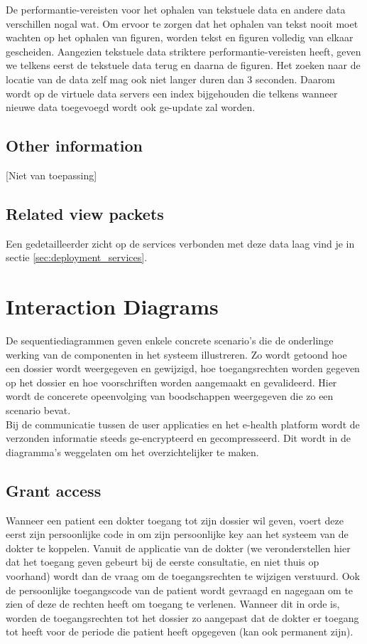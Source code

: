 \documentclass[a4paper,10pt]{article}
\begin{document}
De performantie-vereisten voor het ophalen van tekstuele data en andere data verschillen nogal wat. Om ervoor te zorgen dat het ophalen van tekst nooit moet wachten op het ophalen van figuren, worden tekst en figuren volledig van elkaar gescheiden. Aangezien tekstuele data striktere performantie-vereisten heeft, geven we telkens eerst de tekstuele data terug en daarna de figuren. Het zoeken naar de locatie van de data zelf mag ook niet langer duren dan 3 seconden. Daarom wordt op de virtuele data servers een index bijgehouden die telkens wanneer nieuwe data toegevoegd wordt ook ge-update zal worden.

\subsection{Other information}
[Niet van toepassing]

\subsection{Related view packets}
Een gedetailleerder zicht op de services verbonden met deze data laag vind je in sectie \ref{sec:deployment_services}.

\clearpage
\section{Interaction Diagrams}
\label{interaction:main}
De sequentiediagrammen geven enkele concrete scenario's die de onderlinge werking van de componenten in het systeem illustreren. Zo wordt getoond hoe een dossier wordt weergegeven en gewijzigd, hoe toegangsrechten worden gegeven op het dossier en hoe voorschriften worden aangemaakt en gevalideerd. Hier wordt de concerete opeenvolging van boodschappen weergegeven die zo een scenario bevat.\\

Bij de communicatie tussen de user applicaties en het e-health platform wordt de verzonden informatie steeds ge-encrypteerd en gecompresseerd. Dit wordt in de diagramma's weggelaten om het overzichtelijker te maken. 


\subsection{Grant access}
\label{interaction:grantAccess}
Wanneer een patient een dokter toegang tot zijn dossier wil geven, voert deze eerst zijn persoonlijke code in om zijn persoonlijke key aan het systeem van de dokter te koppelen. Vanuit de applicatie van de dokter (we veronderstellen hier dat het toegang geven gebeurt bij de eerste consultatie, en niet thuis op voorhand) wordt dan de vraag om de toegangsrechten te wijzigen verstuurd. Ook de persoonlijke toegangscode van de patient wordt gevraagd en nagegaan om te zien of deze de rechten heeft om toegang te verlenen. Wanneer dit in orde is, worden de toegangsrechten tot het dossier zo aangepast dat de dokter er toegang tot heeft voor de periode die patient heeft opgegeven (kan ook permanent zijn). 
\end{document}
